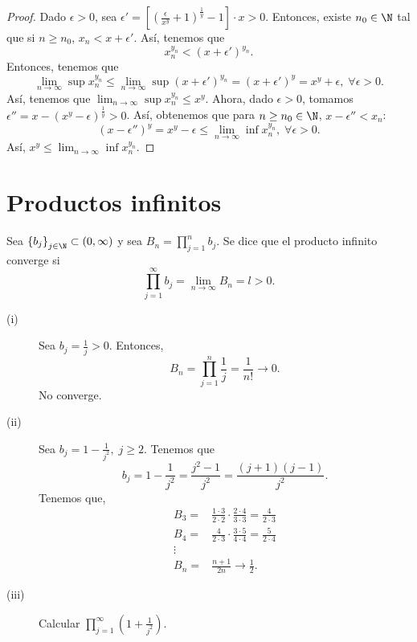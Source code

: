 \begin{proof}
	Dado $\displaystyle \epsilon > 0 $, sea $\displaystyle \epsilon ' = \left[\left(\frac{\epsilon }{x^{y}}+1\right)^{\frac{1}{y}}-1\right] \cdot x > 0 $. Entonces, existe $\displaystyle n_{0} \in \N $ tal que si $\displaystyle n \geq n_{0} $, $\displaystyle x_{n} < x + \epsilon ' $. Así, tenemos que 
\[x_{n}^{y_{n}} < \left(x + \epsilon'\right)^{y_{n}} .\]
Entonces, tenemos que 
\[\lim_{n \to \infty}\sup x_{n}^{y_{n}} \leq \lim_{n \to \infty}\sup\left(x+\epsilon'\right)^{y_{n}}=\left(x+\epsilon'\right)^{y} = x^{y}+\epsilon, \; \forall \epsilon > 0.\]
Así, tenemos que $\displaystyle \lim_{n \to \infty}\sup x_{n}^{y_{n}} \leq x^{y} $. Ahora, dado $\displaystyle \epsilon > 0 $, tomamos $\displaystyle \epsilon '' = x - \left(x^{y}-\epsilon \right)^{\frac{1}{y}} > 0 $. Así, obtenemos que para $\displaystyle n \geq n_{0}\in\N $, $\displaystyle x-\epsilon '' < x_{n} $:
\[\left(x - \epsilon ''\right)^{y} = x^{y}-\epsilon \leq \lim_{n \to \infty}\inf x_{n}^{y_{n}}, \; \forall \epsilon > 0 .\]
Así, $\displaystyle x^{y} \leq \lim_{n \to \infty}\inf x_{n}^{y_{n}} $.
\end{proof}
\section{Productos infinitos}
Sea $\displaystyle \left\{ b_{j}\right\} _{j\in\N}\subset\left(0, \infty\right) $ y sea $\displaystyle B_{n} = \prod^{n}_{j=1}b_{j} $. Se dice que el producto infinito converge si 
\[\prod^{\infty}_{j=1}b_{j} = \lim_{n \to \infty}B_{n} = l > 0 .\]

\begin{eg}
\normalfont 
\begin{description}
\item[(i)] Sea $\displaystyle b_{j} = \frac{1}{j} > 0 $. Entonces, 
\[B_{n} = \prod^{n}_{j=1}\frac{1}{j} = \frac{1}{n!} \to 0 .\]
No converge. 
\item[(ii)] Sea $\displaystyle b_{j}= 1 - \frac{1}{j^{2}}, \; j \geq 2 $. Tenemos que 
	\[b_{j} = 1 - \frac{1}{j^{2}} = \frac{j^{2}-1}{j^{2}} = \frac{\left(j+1\right)\left(j-1\right)}{j^{2}} .\]
Tenemos que, 
\[
\begin{split}
	B_{3} = & \frac{1 \cdot 3}{2 \cdot 2} \cdot \frac{2 \cdot 4}{3 \cdot 3} = \frac{4}{2 \cdot 3} \\
	B_{4} = & \frac{4}{2 \cdot 3} \cdot \frac{3 \cdot 5}{4 \cdot 4} = \frac{5}{2 \cdot 4} \\
	\vdots & \\
	B_{n} = & \frac{n+1}{2n} \to \frac{1}{2}.
\end{split}
\]
\item[(iii)] Calcular $\displaystyle \prod^{\infty}_{j=1}\left(1 +\frac{1}{j^{2}}\right) $.
\end{description}
\end{eg}

